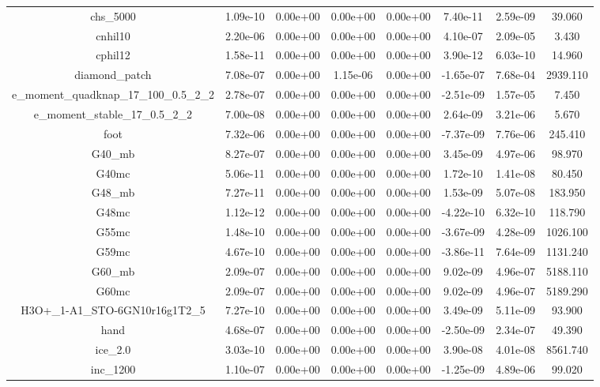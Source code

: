 {{\begin{table}[h]
\begin{center}
{\begin{tabular}{cccccccc}
            chs\_5000 & 1.09e-10 & 0.00e+00 & 0.00e+00 & 0.00e+00 & 7.40e-11 & 2.59e-09 & 39.060 \\ 
             cnhil10 & 2.20e-06 & 0.00e+00 & 0.00e+00 & 0.00e+00 & 4.10e-07 & 2.09e-05 & 3.430 \\ 
             cphil12 & 1.58e-11 & 0.00e+00 & 0.00e+00 & 0.00e+00 & 3.90e-12 & 6.03e-10 & 14.960 \\ 
       diamond\_patch & 7.08e-07 & 0.00e+00 & 1.15e-06 & 0.00e+00 & -1.65e-07 & 7.68e-04 & 2939.110 \\ 
e\_moment\_quadknap\_17\_100\_0.5\_2\_2 & 2.78e-07 & 0.00e+00 & 0.00e+00 & 0.00e+00 & -2.51e-09 & 1.57e-05 & 7.450 \\ 
e\_moment\_stable\_17\_0.5\_2\_2 & 7.00e-08 & 0.00e+00 & 0.00e+00 & 0.00e+00 & 2.64e-09 & 3.21e-06 & 5.670 \\ 
                foot & 7.32e-06 & 0.00e+00 & 0.00e+00 & 0.00e+00 & -7.37e-09 & 7.76e-06 & 245.410 \\ 
              G40\_mb & 8.27e-07 & 0.00e+00 & 0.00e+00 & 0.00e+00 & 3.45e-09 & 4.97e-06 & 98.970 \\ 
               G40mc & 5.06e-11 & 0.00e+00 & 0.00e+00 & 0.00e+00 & 1.72e-10 & 1.41e-08 & 80.450 \\ 
              G48\_mb & 7.27e-11 & 0.00e+00 & 0.00e+00 & 0.00e+00 & 1.53e-09 & 5.07e-08 & 183.950 \\ 
               G48mc & 1.12e-12 & 0.00e+00 & 0.00e+00 & 0.00e+00 & -4.22e-10 & 6.32e-10 & 118.790 \\ 
               G55mc & 1.48e-10 & 0.00e+00 & 0.00e+00 & 0.00e+00 & -3.67e-09 & 4.28e-09 & 1026.100 \\ 
               G59mc & 4.67e-10 & 0.00e+00 & 0.00e+00 & 0.00e+00 & -3.86e-11 & 7.64e-09 & 1131.240 \\ 
              G60\_mb & 2.09e-07 & 0.00e+00 & 0.00e+00 & 0.00e+00 & 9.02e-09 & 4.96e-07 & 5188.110 \\ 
               G60mc & 2.09e-07 & 0.00e+00 & 0.00e+00 & 0.00e+00 & 9.02e-09 & 4.96e-07 & 5189.290 \\ 
H3O+\_1-A1\_STO-6GN10r16g1T2\_5 & 7.27e-10 & 0.00e+00 & 0.00e+00 & 0.00e+00 & 3.49e-09 & 5.11e-09 & 93.900 \\ 
                hand & 4.68e-07 & 0.00e+00 & 0.00e+00 & 0.00e+00 & -2.50e-09 & 2.34e-07 & 49.390 \\ 
             ice\_2.0 & 3.03e-10 & 0.00e+00 & 0.00e+00 & 0.00e+00 & 3.90e-08 & 4.01e-08 & 8561.740 \\ 
            inc\_1200 & 1.10e-07 & 0.00e+00 & 0.00e+00 & 0.00e+00 & -1.25e-09 & 4.89e-06 & 99.020 \\ 

\end{tabular}}
\end{center}
\end{table}}}
